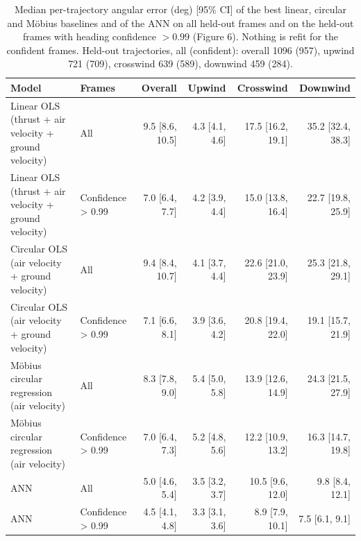 \begin{table}[h!]
    \centering
    \caption{Median per-trajectory angular error (deg) [95\% CI] of the best linear, circular and M\"obius baselines and of the ANN on all held-out frames and on the held-out frames with heading confidence $> 0.99$ (Figure 6). Nothing is refit for the confident frames. Held-out trajectories, all (confident): overall 1096 (957), upwind 721 (709), crosswind 639 (589), downwind 459 (284).}
    \label{tab:confident_frames}
    \begin{tabular}{@{}llrrrr@{}}
        \toprule
        Model & Frames & Overall & Upwind & Crosswind & Downwind \\
        \midrule
        Linear OLS (thrust + air velocity + ground velocity) & All & 9.5 [8.6, 10.5] & 4.3 [4.1, 4.6] & 17.5 [16.2, 19.1] & 35.2 [32.4, 38.3] \\
        Linear OLS (thrust + air velocity + ground velocity) & Confidence > 0.99 & 7.0 [6.4, 7.7] & 4.2 [3.9, 4.4] & 15.0 [13.8, 16.4] & 22.7 [19.8, 25.9] \\
        Circular OLS (air velocity + ground velocity) & All & 9.4 [8.4, 10.7] & 4.1 [3.7, 4.4] & 22.6 [21.0, 23.9] & 25.3 [21.8, 29.1] \\
        Circular OLS (air velocity + ground velocity) & Confidence > 0.99 & 7.1 [6.6, 8.1] & 3.9 [3.6, 4.2] & 20.8 [19.4, 22.0] & 19.1 [15.7, 21.9] \\
        Möbius circular regression (air velocity) & All & 8.3 [7.8, 9.0] & 5.4 [5.0, 5.8] & 13.9 [12.6, 14.9] & 24.3 [21.5, 27.9] \\
        Möbius circular regression (air velocity) & Confidence > 0.99 & 7.0 [6.4, 7.3] & 5.2 [4.8, 5.6] & 12.2 [10.9, 13.2] & 16.3 [14.7, 19.8] \\
        ANN & All & 5.0 [4.6, 5.4] & 3.5 [3.2, 3.7] & 10.5 [9.6, 12.0] & 9.8 [8.4, 12.1] \\
        ANN & Confidence > 0.99 & 4.5 [4.1, 4.8] & 3.3 [3.1, 3.6] & 8.9 [7.9, 10.1] & 7.5 [6.1, 9.1] \\
        \bottomrule
    \end{tabular}
\end{table}
